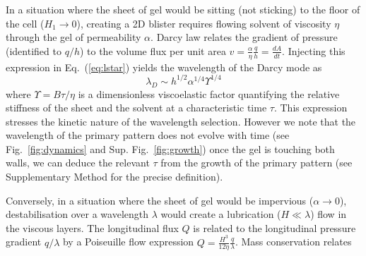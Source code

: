 \documentclass[twocolumn,superscriptaddress,showpacs,preprintnumbers,amsmath,amssymb,prl]{revtex4-1}
\begin{document}
In a situation where the sheet of gel would be sitting (not sticking) to the floor of the cell ($H_1\rightarrow0$), creating a 2D blister requires flowing solvent of viscosity $\eta$ through the gel of permeability $\alpha$. Darcy law relates the gradient of pressure (identified to $q/h$) to the volume flux per unit area $v = \frac{\alpha}{\eta}\frac{q}{h} = \frac{dA}{dt}$. Injecting this expression in Eq.~(\ref{eq:lstar}) yields the wavelength of the Darcy mode as
\begin{equation}
\lambda_D \sim h^{1/2} \alpha^{1/4} \Upsilon^{1/4}
\end{equation}
where $\Upsilon = B\tau/\eta$ is a dimensionless viscoelastic factor quantifying the relative stiffness of the sheet and the solvent at a characteristic time $\tau$. This expression stresses the kinetic nature of the wavelength selection. However we note that the wavelength of the primary pattern does not evolve with time (see Fig.~\ref{fig:dynamics} and Sup. Fig.~\ref{fig:growth}) once the gel is touching both walls, we can deduce the relevant $\tau$ from the growth of the primary pattern (see Supplementary Method for the precise definition).

Conversely, in a situation where the sheet of gel would be impervious ($\alpha\rightarrow 0$), destabilisation over a wavelength $\lambda$ would create a lubrication ($H\ll\lambda$) flow in the viscous layers. The longitudinal flux $Q$ is related to the longitudinal pressure gradient $q/\lambda$ by a Poiseuille flow expression $Q = \frac{H^3}{12\eta} \frac{q}{\lambda}$. Mass conservation relates
\end{document}
